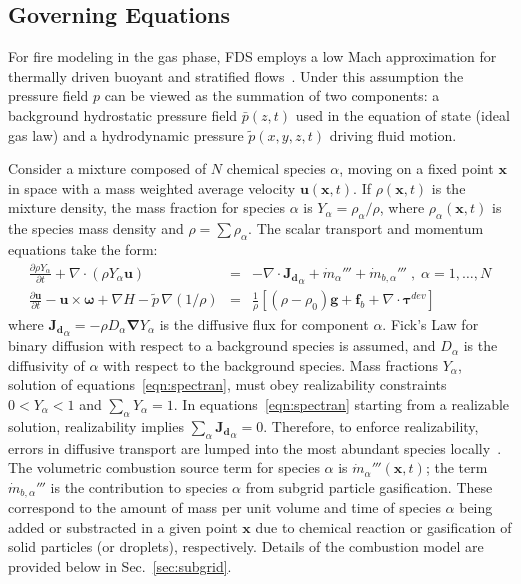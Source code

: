 \documentclass[journal,article,atmosphere,submit,moreauthors,pdftex]{Definitions_Review_Process/mdpi}
\begin{document}
\subsection{Governing Equations} \label{sec:goveqns}

For fire modeling in the gas phase, FDS employs a low Mach approximation for thermally driven buoyant and stratified flows~\cite{Rehm:1}. Under this assumption the pressure field $p$ can be viewed as the summation of two components: a background hydrostatic pressure field $\bar{p}(z,t)$ used in the equation of state (ideal gas law) and a hydrodynamic pressure $\tilde{p}(x,y,z,t)$ driving fluid motion.

Consider a mixture composed of $N$ chemical species $\alpha$, moving on a fixed point $\mathbf{x}$ in space with a mass weighted average velocity $\mathbf{u}(\mathbf{x},t)$. If $\rho(\mathbf{x},t)$ is the mixture density, the mass fraction for species $\alpha$ is $Y_\alpha = \rho_\alpha / \rho$, where $\rho_\alpha(\mathbf{x},t)$ is the species mass density and $\rho = \sum \rho_\alpha$. The scalar transport and momentum equations take the form:
\begin{eqnarray}
   \frac{\partial \rho Y_\alpha}{ \partial t} + \nabla \cdot ( \rho Y_\alpha  \mathbf{u} ) &=& - \nabla \cdot \mathbf{J_{d}}_\alpha + \dot{m}_\alpha'''  +
    \dot{m}_{b,\alpha}'''\; , \; \alpha=1,\dots,N \label{eqn:spectran} \\
    \frac{\partial \mathbf{u}}{\partial t} - \mathbf{u} \times \boldsymbol{\omega} + \nabla H - \tilde{p} \, \nabla \left( 1/\rho\right) &=&
    \frac{1}{\rho} \left[ (\rho-\rho_0) \mathbf{g} + \mathbf{f}_{b} + \nabla \cdot \boldsymbol{\tau}^{dev} \right] \label{eqn:momtran}
\end{eqnarray}
where $\mathbf{J_{d}}_\alpha=- \rho D_\alpha \boldsymbol{\nabla} Y_\alpha$ is the diffusive flux for component $\alpha$. Fick's Law for binary diffusion with respect to a background species is assumed, and $D_\alpha$ is the diffusivity of $\alpha$ with respect to the background species.  Mass fractions $Y_\alpha$, solution of equations~\eqref{eqn:spectran}, must obey realizability constraints $0<Y_\alpha<1$ and $\sum_\alpha Y_\alpha=1$. In equations~\eqref{eqn:spectran} starting from a realizable solution, realizability implies $\sum_\alpha \mathbf{J_{d}}_\alpha = 0$. Therefore, to enforce realizability, errors in diffusive transport are lumped into the most abundant species locally~\cite{McDermott:2015}. The volumetric combustion source term for species $\alpha$ is $\dot{m}_\alpha'''(\mathbf{x},t)$;  the term $\dot{m}_{b,\alpha}'''$ is the contribution to species $\alpha$ from subgrid particle gasification. These correspond to the amount of mass per unit volume and time of species $\alpha$ being added or substracted in a given point $\mathbf{x}$ due to chemical reaction or gasification of solid particles (or droplets), respectively.  Details of the combustion model are provided below in Sec.~\ref{sec:subgrid}.
\end{document}

